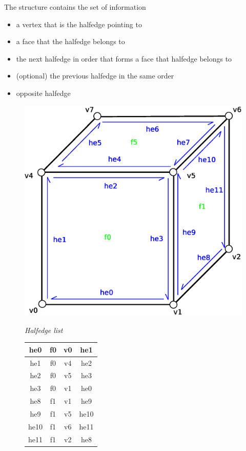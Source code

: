The structure contains the set of information
\begin{itemize}
\item a vertex that is the halfedge pointing to
\item a face that the halfedge belongs to
\item the next halfedge in order that forms a face that halfedge belongs to
\item (optional) the previous halfedge in the same order
\item opposite halfedge
\end{itemize}

\begin{figure}[h]

\begin{minipage}[hb]{0.65\linewidth}
\centering
\includegraphics[width=0.6\linewidth]{../img/he_rep_mesh.eps}
\label{fig:figure1}
\end{minipage}
\hspace{0.5cm}
\begin{minipage}[hb]{0.25\linewidth}
\centering
\emph{Halfedge list}
\vspace{1mm}

\begin{tabular}{|c|c|c|c|}
\hline
\textsf{he0} & \textsf{f0} & \textsf{v0} & \textsf{he1}\\
\hline
\textsf{he1} & \textsf{f0} & \textsf{v4} & \textsf{he2}\\
\hline
\textsf{he2} & \textsf{f0} & \textsf{v5} & \textsf{he3}\\
\hline
\textsf{he3} & \textsf{f0} & \textsf{v1} & \textsf{he0}\\
\hline

\hline
\textsf{he8} & \textsf{f1} & \textsf{v1} & \textsf{he9}\\
\hline
\textsf{he9} & \textsf{f1} & \textsf{v5} & \textsf{he10}\\
\hline
\textsf{he10} & \textsf{f1} & \textsf{v6} & \textsf{he11}\\
\hline
\textsf{he11} & \textsf{f1} & \textsf{v2} & \textsf{he8}\\
\hline


\end{tabular}
\end{minipage}
\end{figure}
